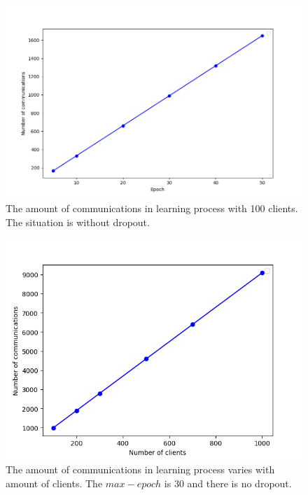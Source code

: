 \begin{figure}[!ht]
    \centering
    \includegraphics[width=\columnwidth]{img/comm-epoch.png}
    \caption{The amount of communications in learning process with 100 clients. The situation is without dropout.}
    \label{comm-epoch}
\end{figure}

\begin{figure}[!ht]
    \centering
    \includegraphics[width=\columnwidth]{img/comm-client.png}
    \caption{The amount of communications in learning process varies with amount of clients. The $max-epoch$ is 30 and there is no dropout.}
    \label{comm-client}
\end{figure}


